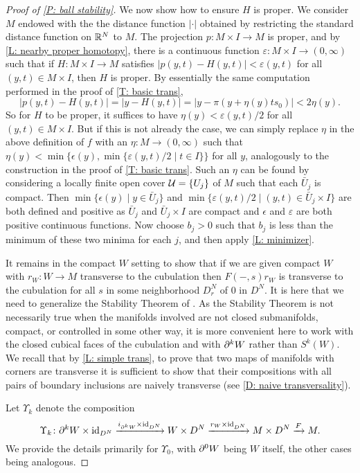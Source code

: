 \begin{proof}[Proof of \cref{P: ball stability}]
	We now show how to ensure $H$ is proper.
	We consider $M$ endowed with the the distance function $|\cdot|$ obtained by restricting the standard distance function on $\mathbb{R}^N$ to $M$.
	The projection $p \colon M \times I \to M$ is proper, and by
	\cref{L: nearby proper homotopy}, there is a continuous function $\varepsilon \colon M \times I \to (0,\infty)$ such that if $H \colon M \times I \to M$ satisfies $|p(y,t)-H(y,t)| < \varepsilon(y,t)$ for all $(y,t) \in M \times I$, then $H$ is proper.
	By essentially the same computation performed in the proof of \cref{T: basic trans},
	$$|p(y,t)-H(y,t)| = |y-H(y,t)| = |y - \pi(y + \eta(y) ts_0)| < 2 \eta(y).$$
	So for $H$ to be proper, it suffices to have $\eta(y) < \varepsilon(y,t)/2$ for all $(y,t) \in M \times I$.
	But if this is not already the case, we can simply replace $\eta$ in the above definition of $f$ with an $\eta \colon M \to (0,\infty)$ such that $\eta(y) < \min\{\epsilon(y), \min\{\varepsilon(y,t)/2 \mid t \in I\}\}$ for all $y$, analogously to the construction in the proof of \cref{T: basic trans}.
	Such an $\eta$ can be found by considering a locally finite open cover $\mathcal{U} = \{U_j\}$ of $M$ such that each $\bar U_j$ is compact.
	Then $\min\{\epsilon(y) \mid y \in \bar U_j\}$ and $\min\{\varepsilon(y,t)/2 \mid (y,t) \in \bar U_j \times I\}$ are both defined and positive as $\bar U_j$ and $\bar U_j \times I$ are compact and $\epsilon$ and $\varepsilon$ are both positive continuous functions.
	Now choose $b_j > 0$ such that $b_j$ is less than the minimum of these two minima for each $j$, and then apply \cref{L: minimizer}.

	It remains in the compact $W$ setting to show that if we are given compact $W$ with $r_W \colon W \to M$ transverse to the cubulation then $F(-,s)r_W$ is transverse to the cubulation for all $s$ in some neighborhood $D_r^N$ of $0$ in $D^N$.
	It is here that we need to generalize the Stability Theorem of \cite[Section 1.6]{GuPo74}.
	As the Stability Theorem is not necessarily true when the manifolds involved are not closed submanifolds, compact, or controlled in some other way, it is more convenient here to work with the closed cubical faces of the cubulation and with $\partial^kW$ rather than $S^k(W)$.
	We recall that by \cref{L: simple trans}, to prove that two maps of manifolds with corners are transverse it is sufficient to show that their compositions with all pairs of boundary inclusions are naively transverse (see \cref{D: naive transversality}).

	Let $\Upsilon_k$ denote the composition $$\Upsilon_k \colon \partial^kW \times \mathrm{id}_{D^N} \xrightarrow{i_{\partial^ kW} \times \mathrm{id}_{D^N}} W \times D^N \xrightarrow{r_W \times \mathrm{id}_{D^N} } M \times D^N \xrightarrow{F} M.$$
	We provide the details primarily for $\Upsilon_0$, with $\partial^0 W$ being $W$ itself, the other cases being analogous.



\end{proof}

